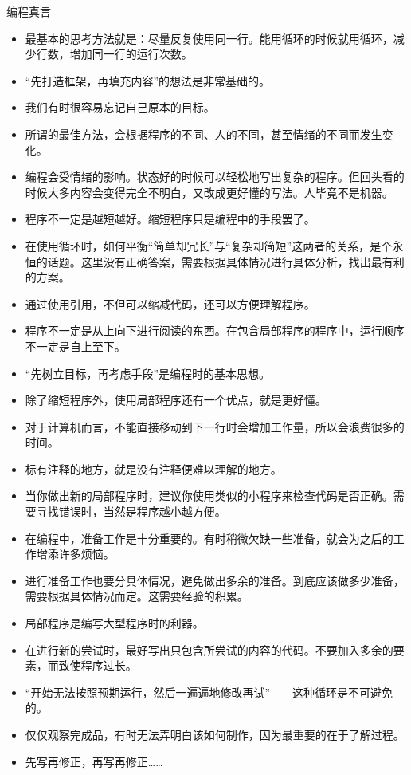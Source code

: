 \begin{frame}
\begin{block}{编程真言}
\begin{itemize}
      \item 最基本的思考方法就是：尽量反复使用同一行。能用循环的时候就用循环，减少行数，增加同一行的运行次数。
      \item “先打造框架，再填充内容”的想法是非常基础的。
      \item 我们有时很容易忘记自己原本的目标。
      \item 所谓的最佳方法，会根据程序的不同、人的不同，甚至情绪的不同而发生变化。
      \item 编程会受情绪的影响。状态好的时候可以轻松地写出复杂的程序。但回头看的时候大多内容会变得完全不明白，又改成更好懂的写法。人毕竟不是机器。
      \item 程序不一定是越短越好。缩短程序只是编程中的手段罢了。
      \item 在使用循环时，如何平衡“简单却冗长”与“复杂却简短”这两者的关系，是个永恒的话题。这里没有正确答案，需要根据具体情况进行具体分析，找出最有利的方案。
      \item 通过使用引用，不但可以缩减代码，还可以方便理解程序。
      \item 程序不一定是从上向下进行阅读的东西。在包含局部程序的程序中，运行顺序不一定是自上至下。
      \item “先树立目标，再考虑手段”是编程时的基本思想。
      \item 除了缩短程序外，使用局部程序还有一个优点，就是更好懂。
      \item 对于计算机而言，不能直接移动到下一行时会增加工作量，所以会浪费很多的时间。
      \item 标有注释的地方，就是没有注释便难以理解的地方。
      \item 当你做出新的局部程序时，建议你使用类似的小程序来检查代码是否正确。需要寻找错误时，当然是程序越小越方便。
      \item 在编程中，准备工作是十分重要的。有时稍微欠缺一些准备，就会为之后的工作增添许多烦恼。
      \item 进行准备工作也要分具体情况，避免做出多余的准备。到底应该做多少准备，需要根据具体情况而定。这需要经验的积累。
      \item 局部程序是编写大型程序时的利器。
      \item 在进行新的尝试时，最好写出只包含所尝试的内容的代码。不要加入多余的要素，而致使程序过长。 
      \item “开始无法按照预期运行，然后一遍遍地修改再试”——这种循环是不可避免的。
      \item 仅仅观察完成品，有时无法弄明白该如何制作，因为最重要的在于了解过程。
      \item 先写再修正，再写再修正……

\end{itemize}
\end{block}
\end{frame}

